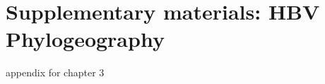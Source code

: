 \chapter{Supplementary materials: HBV Phylogeography}
\label{appendixC}

appendix for chapter 3

\cleardoublepage

